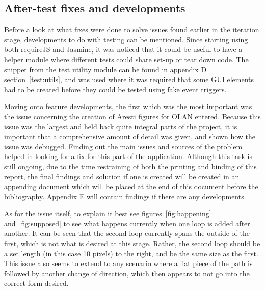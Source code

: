 \subsection{After-test fixes and developments}
Before a look at what fixes were done to solve issues found earlier in the iteration stage, developments to do with testing can be mentioned. Since starting using both requireJS and Jasmine, it was noticed that it could be useful to have a helper module where different tests could share set-up or tear down code. The snippet from the test utility module can be found in appendix D section~\ref{test:utils}, and was used where it was required that some GUI elements had to be created before they could be tested using fake event triggers.

Moving onto feature developments, the first which was the most important was the issue concerning the creation of Aresti figures for OLAN entered. Because this issue was the largest and held back quite integral parts of the project, it is important that a comprehensive amount of detail was given, and shown how the issue was debugged. Finding out the main issues and sources of the problem helped in looking for a fix for this part of the application. Although this task is still ongoing, due to the time restraining of both the printing and binding of this report, the final findings and solution if one is created will be created in an appending document which will be placed at the end of this document before the bibliography. Appendix E will contain findings if there are any developments. 

As for the issue itself, to explain it best see figures~\ref{fig:happening} and~\ref{fig:supposed} to see what happens currently when one loop is added after another. It can be seen that the second loop currently spans the outside of the first, which is not what is desired at this stage. Rather, the second loop should be a set length (in this case 10 pixels) to the right, and be the same size as the first. This issue also seems to extend to any scenario where a flat piece of the path is followed by another change of direction, which then appears to not go into the correct form desired. 

